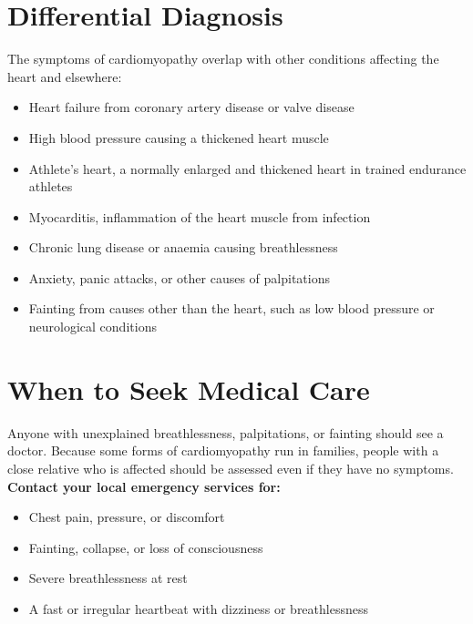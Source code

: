 \section*{Differential Diagnosis}
The symptoms of cardiomyopathy overlap with other conditions affecting the heart and elsewhere:
\begin{itemize}
    \item Heart failure from coronary artery disease or valve disease
    \item High blood pressure causing a thickened heart muscle
    \item Athlete's heart, a normally enlarged and thickened heart in trained endurance athletes
    \item Myocarditis, inflammation of the heart muscle from infection
    \item Chronic lung disease or anaemia causing breathlessness
    \item Anxiety, panic attacks, or other causes of palpitations
    \item Fainting from causes other than the heart, such as low blood pressure or neurological conditions
\end{itemize}

\section*{When to Seek Medical Care}
Anyone with unexplained breathlessness, palpitations, or fainting should see a doctor. Because some forms of cardiomyopathy run in families, people with a close relative who is affected should be assessed even if they have no symptoms.
\textbf{Contact your local emergency services for:}
\begin{itemize}
    \item Chest pain, pressure, or discomfort
    \item Fainting, collapse, or loss of consciousness
    \item Severe breathlessness at rest
    \item A fast or irregular heartbeat with dizziness or breathlessness
\end{itemize}

